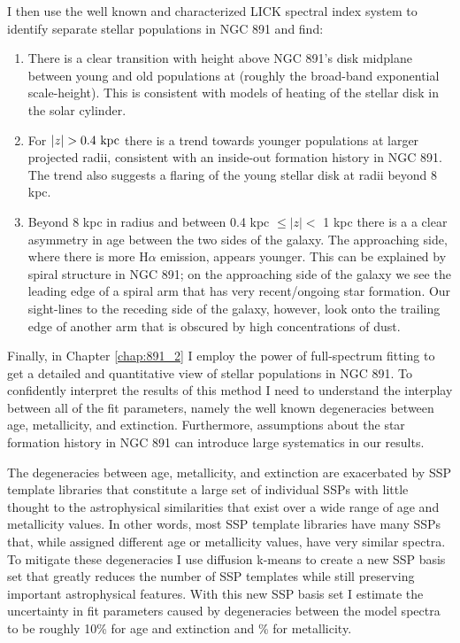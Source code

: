 I then use the well known and characterized LICK spectral index system
to identify separate stellar populations in NGC 891 and find:
\begin{enumerate}

\item There is a clear transition with height above NGC 891's disk
  midplane between young and old populations at 
  (roughly the broad-band exponential scale-height). This is
  consistent with models of heating of the stellar disk in the solar
  cylinder.

  \item For $|z| > 0.4~\mathrm{kpc} $ there is a trend towards younger
    populations at larger projected radii, consistent with an
    inside-out formation history in NGC 891. The trend also suggests a
    flaring of the young stellar disk at radii beyond 8 kpc.

  \item Beyond 8 kpc in radius and between 0.4 kpc $\leq |z| <$ 1 kpc
    there is a a clear asymmetry in age between the two sides of the
    galaxy. The approaching side, where there is more H$\alpha$
    emission, appears younger. This can be explained by spiral
    structure in NGC 891; on the approaching side of the galaxy we see
    the leading edge of a spiral arm that has very recent/ongoing star
    formation. Our sight-lines to the receding side of the galaxy,
    however, look onto the trailing edge of another arm that is
    obscured by high concentrations of dust.

\end{enumerate}

Finally, in Chapter \ref{chap:891_2} I employ the power of
full-spectrum fitting to get a detailed and quantitative view of
stellar populations in NGC 891. To confidently interpret the results
of this method I need to understand the interplay between all of the
fit parameters, namely the well known degeneracies between age,
metallicity, and extinction. Furthermore, assumptions about the star
formation history in NGC 891 can introduce large systematics in our
results.

The degeneracies between age, metallicity, and extinction are
exacerbated by SSP template libraries that constitute a large set of
individual SSPs with little thought to the astrophysical similarities
that exist over a wide range of age and metallicity values. In other
words, most SSP template libraries have many SSPs that, while assigned
different age or metallicity values, have very similar spectra. To
mitigate these degeneracies I use diffusion k-means to create a new
SSP basis set that greatly reduces the number of SSP templates while
still preserving important astrophysical features. With this new SSP
basis set I estimate the uncertainty in fit parameters caused by
degeneracies between the model spectra to be roughly 10\% for age and
extinction and \% for metallicity.

